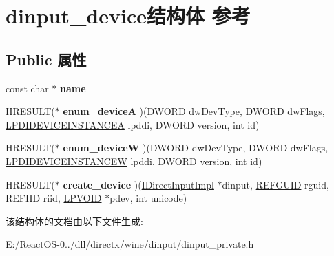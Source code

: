 \hypertarget{structdinput__device}{}\section{dinput\+\_\+device结构体 参考}
\label{structdinput__device}
\subsection*{Public 属性}
\begin{DoxyCompactItemize}
\item 
\mbox{\label{structdinput__device_a079506bac3cdf034a7ee545b59957336}} 
const char $\ast$ {\bfseries name}
\item 
\mbox{\label{structdinput__device_a2a72057a0f07b02ceaa00a4b6c882059}} 
H\+R\+E\+S\+U\+LT($\ast$ {\bfseries enum\+\_\+deviceA} )(D\+W\+O\+RD dw\+Dev\+Type, D\+W\+O\+RD dw\+Flags, \hyperlink{struct_d_i_d_e_v_i_c_e_i_n_s_t_a_n_c_e_a}{L\+P\+D\+I\+D\+E\+V\+I\+C\+E\+I\+N\+S\+T\+A\+N\+C\+EA} lpddi, D\+W\+O\+RD version, int id)
\item 
\mbox{\label{structdinput__device_a0307f52f0db1bb54f8341e75b1266448}} 
H\+R\+E\+S\+U\+LT($\ast$ {\bfseries enum\+\_\+deviceW} )(D\+W\+O\+RD dw\+Dev\+Type, D\+W\+O\+RD dw\+Flags, \hyperlink{struct_d_i_d_e_v_i_c_e_i_n_s_t_a_n_c_e_w}{L\+P\+D\+I\+D\+E\+V\+I\+C\+E\+I\+N\+S\+T\+A\+N\+C\+EW} lpddi, D\+W\+O\+RD version, int id)
\item 
\mbox{\label{structdinput__device_a94392794e9d93c4ef0a70528cf6e7709}} 
H\+R\+E\+S\+U\+LT($\ast$ {\bfseries create\+\_\+device} )(\hyperlink{struct_i_direct_input_impl}{I\+Direct\+Input\+Impl} $\ast$dinput, \hyperlink{struct___g_u_i_d}{R\+E\+F\+G\+U\+ID} rguid, R\+E\+F\+I\+ID riid, \hyperlink{interfacevoid}{L\+P\+V\+O\+ID} $\ast$pdev, int unicode)
\end{DoxyCompactItemize}


该结构体的文档由以下文件生成\+:\begin{DoxyCompactItemize}
\item 
E\+:/\+React\+O\+S-\/0../dll/directx/wine/dinput/dinput\+\_\+private.\+h\end{DoxyCompactItemize}
